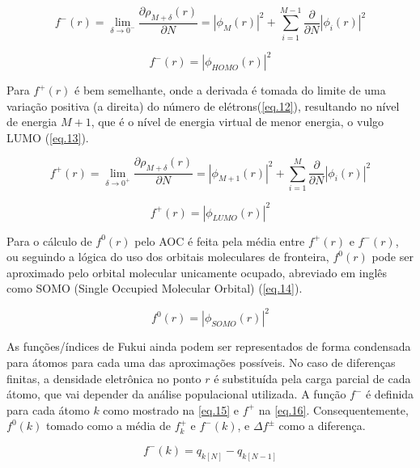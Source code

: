 \documentclass[a4paper,11pt]{refart}
\begin{document}
\begin{equation}
f^{-}(r) = \lim_{\delta \to 0^-} \frac{\partial \rho_{M+\delta}(r)}{\partial N} = |\phi_{M}(r)|^2  +\sum_{i=1}^{M-1} \frac{\partial}{\partial N} |\phi_i(r)|^2
\label{eq.10}
\end{equation}


\begin{equation}
f^{-}(r) = |\phi_{HOMO}(r)|^2 
\label{eq.11}
\end{equation}

Para $f^{+}(r)$ é bem semelhante, onde a derivada é tomada do limite de uma variação positiva (a direita) do número de elétrons(\autoref{eq.12}), resultando no nível de energia $M+1$, que é o nível de energia virtual de menor energia, o vulgo LUMO (\autoref{eq.13}).

\begin{equation}
f^{+}(r) = \lim_{\delta \to 0^+} \frac{\partial \rho_{M+\delta}(r)}{\partial N}	 =  |\phi_{M+1}(r)|^2  + \sum_{i=1}^{M} \frac{\partial}{\partial N} |\phi_i(r)|^2
\label{eq.12}
\end{equation}

\begin{equation}
f^{+}(r) = |\phi_{LUMO}(r)|^2 
\label{eq.13}
\end{equation}

Para o cálculo de $f^{0}(r)$ pelo AOC é feita pela média entre $f^{+}(r)$ e $f^{-}(r)$, ou seguindo a lógica do uso dos orbitais moleculares de fronteira, $f^{0}(r)$ pode ser aproximado pelo orbital molecular unicamente ocupado, abreviado em inglês como SOMO (Single Occupied Molecular Orbital) (\autoref{eq.14}).

\begin{equation}
f^{0}(r) = |\phi_{SOMO}(r)|^2 
\label{eq.14}
\end{equation}

As funções/índices de Fukui ainda podem ser representados de forma condensada para átomos para cada uma das aproximações possíveis. No caso de diferenças finitas, a densidade eletrônica no ponto $r$ é substituída pela carga parcial de cada átomo, que vai depender da análise populacional utilizada. A função $f^{-}$ é definida para cada átomo $k$ como mostrado na \autoref{eq.15} e $f^{+}$ na \autoref{eq.16}. Consequentemente, $f^{0}(k)$ tomado como a média de $f^{+}_k$ e $f^{-}(k)$, e $\Delta f^{\pm}$ como a diferença.

\begin{equation}
f^{-}(k) = q_{k [N]} - q_{k [N-1]}
\label{eq.15}
\end{equation}
\end{document}
